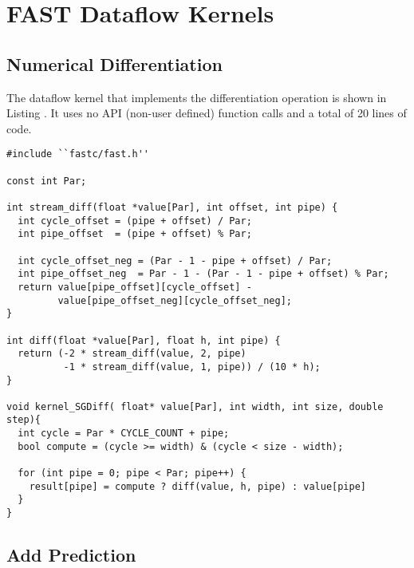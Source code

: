 \chapter{FAST Dataflow Kernels}

\section{Numerical Differentiation}

The \FAST{} dataflow kernel that implements the differentiation
operation is shown in Listing {}. It uses no API (non-user defined)
function calls and a total of 20 lines of code.

\begin{lstlisting}
#include ``fastc/fast.h''

const int Par;

int stream_diff(float *value[Par], int offset, int pipe) {
  int cycle_offset = (pipe + offset) / Par;
  int pipe_offset  = (pipe + offset) % Par;

  int cycle_offset_neg = (Par - 1 - pipe + offset) / Par;
  int pipe_offset_neg  = Par - 1 - (Par - 1 - pipe + offset) % Par;
  return value[pipe_offset][cycle_offset] -
         value[pipe_offset_neg][cycle_offset_neg];
}

int diff(float *value[Par], float h, int pipe) {
  return (-2 * stream_diff(value, 2, pipe)
          -1 * stream_diff(value, 1, pipe)) / (10 * h);
}

void kernel_SGDiff( float* value[Par], int width, int size, double step){
  int cycle = Par * CYCLE_COUNT + pipe;
  bool compute = (cycle >= width) & (cycle < size - width);

  for (int pipe = 0; pipe < Par; pipe++) {
    result[pipe] = compute ? diff(value, h, pipe) : value[pipe]
  }
}
\end{lstlisting}

\section{Add Prediction}